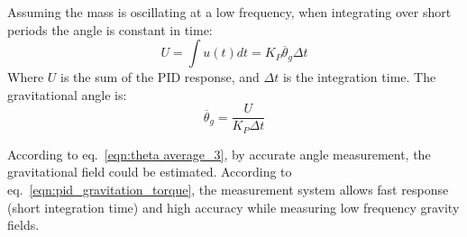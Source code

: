\documentclass[\main/master.tex]{subfiles}
\begin{document}
Assuming the mass is oscillating at a low frequency, when integrating over short periods the angle is constant in time:
\begin{equation}
U = \int u(t) dt = K_P\overline{\theta}_g\Delta t 
\label{eqn:PID_measurement_eqn}
\end{equation}
Where $U$ is the sum of the PID response, and $\Delta t$ is the integration time. The gravitational angle is:
\begin{equation}
\overline{\theta}_g = \frac{U}{K_P\Delta t}      \label{eqn:pid_gravitation_torque}
\end{equation}
\par\noindent
According to eq.~\ref{eqn:theta average_3}, by accurate angle measurement, the gravitational field could be estimated. According to eq.~\ref{eqn:pid_gravitation_torque}, the measurement system allows fast response (short integration time) and high accuracy while measuring low frequency gravity fields. 

 
 
 
 
\end{document}
